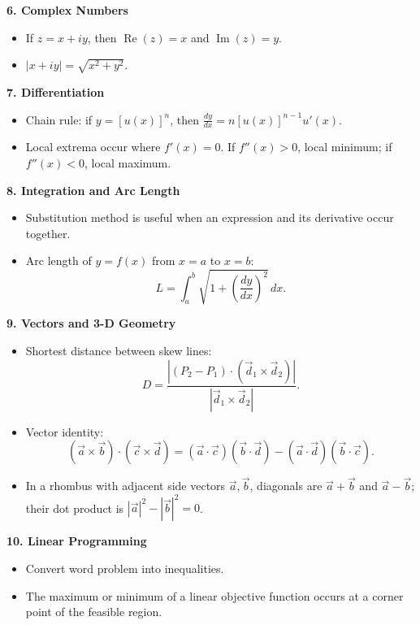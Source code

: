 \documentclass[11pt,a4paper]{article}
\begin{document}
\begin{tcolorbox}[breakable,colback=lightgray,colframe=titleblue,title=Key Theory Required for This Paper]
\textbf{6. Complex Numbers}
\begin{itemize}[leftmargin=1.2em]
\item If \(z=x+iy\), then \(\operatorname{Re}(z)=x\) and \(\operatorname{Im}(z)=y\).
\item \(|x+iy|=\sqrt{x^2+y^2}\).
\end{itemize}

\textbf{7. Differentiation}
\begin{itemize}[leftmargin=1.2em]
\item Chain rule: if \(y=[u(x)]^n\), then \(\frac{dy}{dx}=n[u(x)]^{n-1}u'(x)\).
\item Local extrema occur where \(f'(x)=0\). If \(f''(x)>0\), local minimum; if \(f''(x)<0\), local maximum.
\end{itemize}

\textbf{8. Integration and Arc Length}
\begin{itemize}[leftmargin=1.2em]
\item Substitution method is useful when an expression and its derivative occur together.
\item Arc length of \(y=f(x)\) from \(x=a\) to \(x=b\):
\[
L=\int_a^b\sqrt{1+\left(\frac{dy}{dx}\right)^2}\,dx.
\]
\end{itemize}

\textbf{9. Vectors and 3-D Geometry}
\begin{itemize}[leftmargin=1.2em]
\item Shortest distance between skew lines:
\[
D=\frac{|(P_2-P_1)\cdot(\vec d_1\times\vec d_2)|}{|\vec d_1\times\vec d_2|}.
\]
\item Vector identity:
\[
(\vec a\times\vec b)\cdot(\vec c\times\vec d)=(\vec a\cdot\vec c)(\vec b\cdot\vec d)-(\vec a\cdot\vec d)(\vec b\cdot\vec c).
\]
\item In a rhombus with adjacent side vectors \(\vec a,\vec b\), diagonals are \(\vec a+\vec b\) and \(\vec a-\vec b\); their dot product is \(|\vec a|^2-|\vec b|^2=0\).
\end{itemize}

\textbf{10. Linear Programming}
\begin{itemize}[leftmargin=1.2em]
\item Convert word problem into inequalities.
\item The maximum or minimum of a linear objective function occurs at a corner point of the feasible region.
\end{itemize}
\end{tcolorbox}
\end{document}
